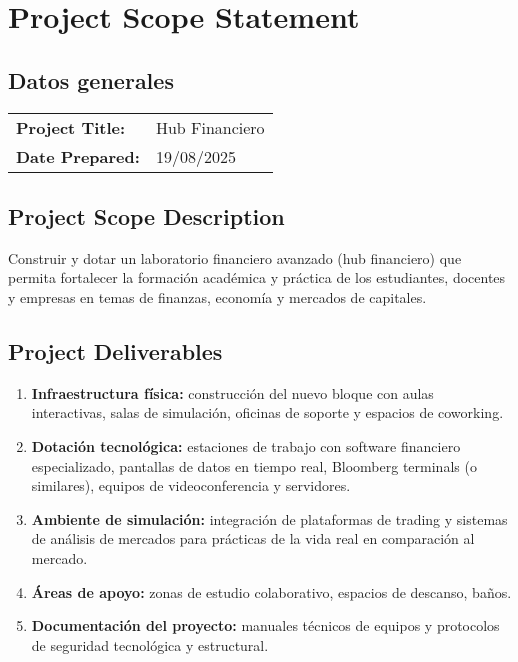 \section{Project Scope Statement}

\subsection{Datos generales}

\begin{tabularx}{\textwidth}{@{}lX@{}}
\textbf{Project Title:} & Hub Financiero \\
\textbf{Date Prepared:} & 19/08/2025 \\
\end{tabularx}

\subsection{Project Scope Description}

Construir y dotar un laboratorio financiero avanzado (hub financiero) que permita fortalecer la formación académica y práctica de los estudiantes, docentes y empresas en temas de finanzas, economía y mercados de capitales.

\subsection{Project Deliverables}

\begin{enumerate}
    \item \textbf{Infraestructura física:} construcción del nuevo bloque con aulas interactivas, salas de simulación, oficinas de soporte y espacios de coworking.
    \item \textbf{Dotación tecnológica:} estaciones de trabajo con software financiero especializado, pantallas de datos en tiempo real, Bloomberg terminals (o similares), equipos de videoconferencia y servidores.
    \item \textbf{Ambiente de simulación:} integración de plataformas de trading y sistemas de análisis de mercados para prácticas de la vida real en comparación al mercado.
    \item \textbf{Áreas de apoyo:} zonas de estudio colaborativo, espacios de descanso, baños.
    \item \textbf{Documentación del proyecto:} manuales técnicos de equipos y protocolos de seguridad tecnológica y estructural.
\end{enumerate}

